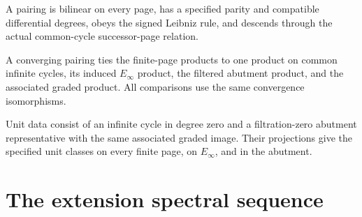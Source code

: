 \begin{definition}
\label{sem:SpectralSequence:pairing}
A pairing is bilinear on every page, has a specified parity and compatible differential degrees, obeys the signed Leibniz rule, and descends through the actual common-cycle successor-page relation.

A converging pairing ties the finite-page products to one product on common infinite cycles, its induced $E_\infty$ product, the filtered abutment product, and the associated graded product. All comparisons use the same convergence isomorphisms.

Unit data consist of an infinite cycle in degree zero and a filtration-zero abutment representative with the same associated graded image. Their projections give the specified unit classes on every finite page, on $E_\infty$, and in the abutment.
\end{definition}


\section{The extension spectral sequence}


